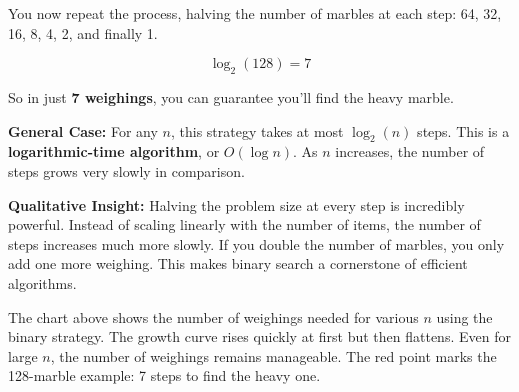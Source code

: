 You now repeat the process, halving the number of marbles at each step: 64, 32, 16, 8, 4, 2, and finally 1.

\[
\log_2(128) = 7
\]

So in just \textbf{7 weighings}, you can guarantee you’ll find the heavy marble.

\medskip

\noindent\textbf{General Case:} For any \( n \), this strategy takes at most \( \log_2(n) \) steps. This is a \textbf{logarithmic-time algorithm}, or \( O(\log n) \). As \( n \) increases, the number of steps grows very slowly in comparison.

\medskip

\noindent\textbf{Qualitative Insight:} Halving the problem size at every step is incredibly powerful. Instead of scaling linearly with the number of items, the number of steps increases much more slowly. If you double the number of marbles, you only add one more weighing. This makes binary search a cornerstone of efficient algorithms.

\begin{center}
\end{center}

\noindent The chart above shows the number of weighings needed for various \( n \) using the binary strategy. The growth curve rises quickly at first but then flattens. Even for large \( n \), the number of weighings remains manageable. The red point marks the 128-marble example: 7 steps to find the heavy one.

